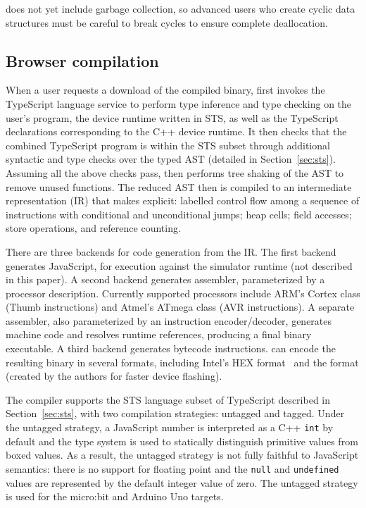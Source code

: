 \MC does not yet include garbage collection, so advanced users who create cyclic
data structures must be careful to break cycles to ensure complete deallocation.

\subsection{Browser compilation}

When a user requests a download of the compiled binary, \MC first invokes the TypeScript language service to perform type inference and type checking on the
user's program, the device runtime written in STS, as well as the TypeScript declarations
corresponding to the C++ device runtime. It then checks that the
combined TypeScript program is within the STS subset through additional syntactic and type checks over the typed AST (detailed in Section~\ref{sec:sts}).  Assuming all the
above checks pass, \MC then performs tree shaking of the AST to remove unused functions.
The reduced AST then is compiled to an intermediate representation (IR) that makes explicit: labelled control
flow among a sequence of instructions with conditional and unconditional jumps; heap cells; field accesses; store operations,
and reference counting.

There are three backends for code generation from the IR. The first backend generates JavaScript,
for execution against the simulator runtime (not described in this paper).  A second backend generates assembler, parameterized by a
processor description.  Currently supported processors include ARM's Cortex class (Thumb instructions)
and Atmel's ATmega class (AVR instructions). A separate assembler, also parameterized by an instruction
encoder/decoder, generates machine code and resolves runtime references, producing a final binary executable. A third backend generates bytecode instructions.
\MC can encode the resulting binary in several formats,
including Intel's HEX format~\cite{IntelHEX} and the \UF format (created by
the authors for faster device flashing).

The \MC compiler supports the STS language subset of TypeScript described in Section~\ref{sec:sts},
with two compilation strategies: untagged and tagged. Under the untagged strategy,
a JavaScript number is interpreted as a C++ \texttt{int} by default and the type system is used
to statically distinguish primitive values from boxed values. As a result, the untagged
strategy is not fully faithful to JavaScript semantics: there is no support for floating
point and the \texttt{null} and \texttt{undefined} values are represented by the default integer value of zero. The untagged strategy is used for the micro:bit and Arduino Uno targets.

